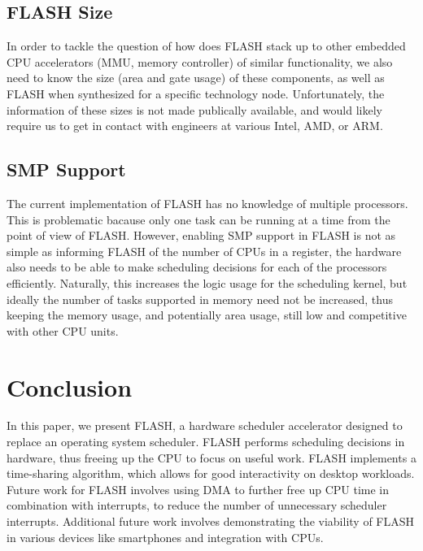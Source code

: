 \documentclass{sig-alternate-10pt}
\begin{document}
\subsection{FLASH Size}
\label{subsec:flash_size}
In order to tackle the question of how does FLASH stack up to other embedded CPU accelerators (MMU, memory controller) of similar functionality, we also need to know the size (area and gate usage) of these components, as well as FLASH when synthesized for a specific technology node. Unfortunately, the information of these sizes is not made publically available, and would likely require us to get in contact with engineers at various Intel, AMD, or ARM.

\subsection{SMP Support}
The current implementation of FLASH has no knowledge of multiple processors. This is problematic bacause only one task can be running at a time from the point of view of FLASH. However, enabling SMP support in FLASH is not as simple as informing FLASH of the number of CPUs in a register, the hardware also needs to be able to make scheduling decisions for each of the processors efficiently. Naturally, this increases the logic usage for the scheduling kernel, but ideally the number of tasks supported in memory need not be increased, thus keeping the memory usage, and potentially area usage, still low and competitive with other CPU units.

\section{Conclusion}
\label{sec:conclusion}
In this paper, we present FLASH, a hardware scheduler accelerator designed to replace an operating system scheduler. FLASH performs scheduling decisions in hardware, thus freeing up the CPU to focus on useful work. FLASH implements a time-sharing algorithm, which allows for good interactivity on desktop workloads. Future work for FLASH involves using DMA to further free up CPU time in combination with interrupts, to reduce the number of unnecessary scheduler interrupts. Additional future work involves demonstrating the viability of FLASH in various devices like smartphones and integration with CPUs.

\nocite{*}
{
	
	
}
\end{document}
